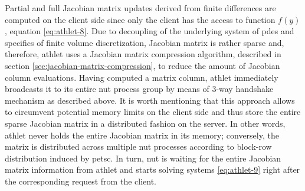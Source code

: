 Partial and full Jacobian matrix updates derived from finite differences are computed on the client side since only the client has the access to function $f(y)$, equation \ref{eq:athlet-8}. Due to decoupling of the underlying system of \gls{pde}s and specifics of finite volume discretization, Jacobian matrix is rather sparse and, therefore, \gls{athlet} uses a Jacobian matrix compression algorithm, described in section \ref{sec:jacobian-matrix-compression}, to reduce the amount of Jacobian column evaluations. Having computed a matrix column, \gls{athlet} immediately broadcasts it to its entire \gls{nut} process group by means of 3-way handshake mechanism as described above. It is worth mentioning that this approach allows to circumvent potential memory limits on the client side and thus store the entire sparse Jacobian matrix in a distributed fashion on the server. In other words, \gls{athlet} never holds the entire Jacobian matrix in its memory; conversely, the matrix is distributed across multiple \gls{nut} processes according to block-row distribution induced by \gls{petsc}. In turn, \gls{nut} is waiting for the entire Jacobian matrix information from \gls{athlet} and starts solving systems \ref{eq:athlet-9} right after the corresponding request from the client.\\


